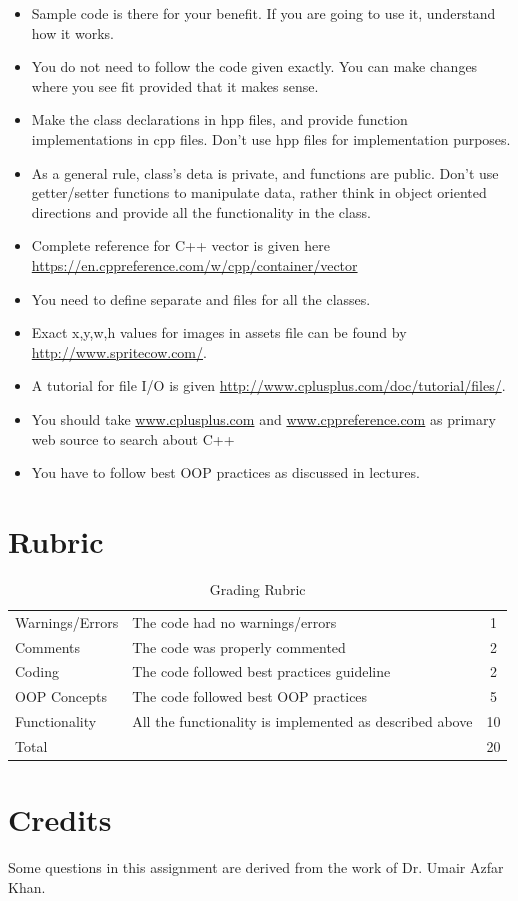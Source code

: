 \documentclass[a4paper,12pt]{article}
\begin{document}
	\begin{itemize}
		\item Sample code is there for your benefit. If you are going to use it, understand how it works. 
		\item You do not need to follow the code given exactly. You can make changes where you see fit provided that it makes sense.
		\item Make the class declarations in hpp files, and provide function implementations in cpp files. Don't use hpp files for implementation purposes.
		\item As a general rule, class's deta is private, and functions are public. Don't use getter/setter functions to manipulate data, rather think in object oriented directions and provide all the functionality in the class.
		\item Complete reference for C++ vector is given here \url{https://en.cppreference.com/w/cpp/container/vector}
		\item You need to define separate  and  files for all the classes.
		\item Exact x,y,w,h values for images in assets file can be found by \url{http://www.spritecow.com/}. 
		\item A tutorial for file I/O is given \url{http://www.cplusplus.com/doc/tutorial/files/}. 
		\item You should take \url{www.cplusplus.com} and \url{www.cppreference.com} as primary web source to search about C++
		\item You have to follow best OOP practices as discussed in lectures.
	\end{itemize}

\newpage

		\section{Rubric}
	\begin{table}[!h]
		\centering
		\begin{tabular}{llc}
			\toprule
			Warnings/Errors	& The code had no warnings/errors	& 1 \\
			Comments &	The code was properly commented	& 2 \\
			Coding	& The code followed best practices guideline &	2 \\
			OOP Concepts & The code followed best OOP practices & 5 \\
			Functionality	& All the functionality is implemented as described above	& 10 \\
			\midrule
			Total & & 20\\
			\bottomrule
		\end{tabular}
		\caption{Grading Rubric}
		\label{Grading}
	\end{table}
	\section{Credits}
		Some questions in this assignment are derived from the work of Dr. Umair Azfar Khan.

	\newpage
	
	
\end{document}
